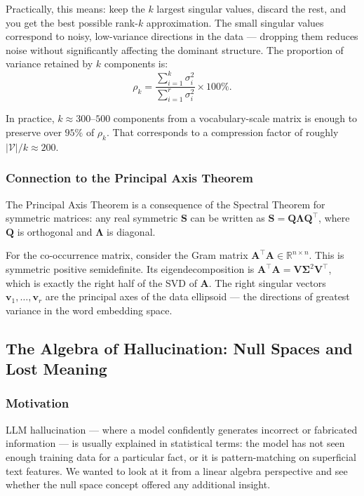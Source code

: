 \documentclass[12pt,a4paper]{article}
\begin{document}
Practically, this means: keep the $k$ largest singular values, discard the rest, and you
get the best possible rank-$k$ approximation. The small singular values correspond to noisy,
low-variance directions in the data --- dropping them reduces noise without significantly
affecting the dominant structure. The proportion of variance retained by $k$ components is:
\begin{equation}
    \rho_k
    = \frac{\displaystyle\sum_{i=1}^{k} \sigma_i^2}
           {\displaystyle\sum_{i=1}^{r} \sigma_i^2}
    \times 100\%.
\end{equation}

In practice, $k \approx 300$--$500$ components from a vocabulary-scale matrix is enough to
preserve over $95\%$ of $\rho_k$. That corresponds to a compression factor of roughly
$|\mathcal{V}|/k \approx 200$.

\subsubsection{Connection to the Principal Axis Theorem}

The Principal Axis Theorem is a consequence of the Spectral Theorem for symmetric matrices:
any real symmetric $\mathbf{S}$ can be written as $\mathbf{S} = \mathbf{Q}\boldsymbol{\Lambda}\mathbf{Q}^\top$,
where $\mathbf{Q}$ is orthogonal and $\boldsymbol{\Lambda}$ is diagonal.

For the co-occurrence matrix, consider the Gram matrix
$\mathbf{A}^\top\mathbf{A} \in \mathbb{R}^{n \times n}$. This is symmetric positive
semidefinite. Its eigendecomposition is $\mathbf{A}^\top\mathbf{A} = \mathbf{V}\boldsymbol{\Sigma}^2\mathbf{V}^\top$,
which is exactly the right half of the SVD of $\mathbf{A}$. The right singular vectors
$\mathbf{v}_1, \ldots, \mathbf{v}_r$ are the principal axes of the data ellipsoid --- the
directions of greatest variance in the word embedding space.

\subsection{The Algebra of Hallucination: Null Spaces and Lost Meaning}

\subsubsection{Motivation}

LLM hallucination --- where a model confidently generates incorrect or fabricated
information --- is usually explained in statistical terms: the model has not seen enough
training data for a particular fact, or it is pattern-matching on superficial text features.
We wanted to look at it from a linear algebra perspective and see whether the null space
concept offered any additional insight.
\end{document}
